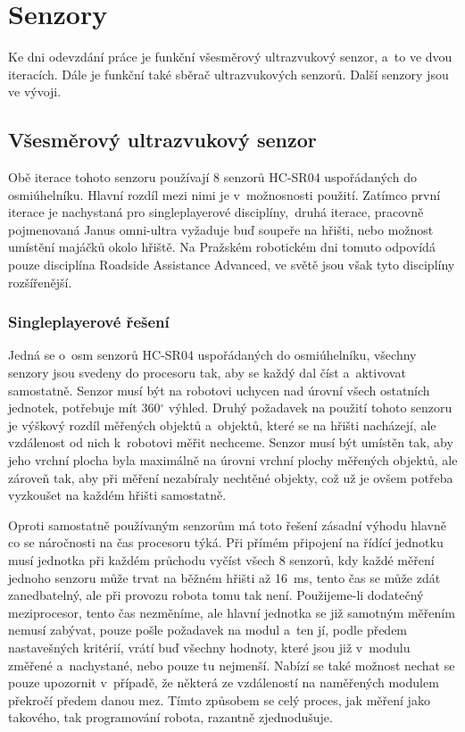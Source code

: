 \chapter{Senzory}
Ke dni odevzdání práce je funkční všesměrový ultrazvukový senzor, a~to ve dvou iteracích.
Dále je funkční také sběrač ultrazvukových senzorů.
Další senzory jsou ve vývoji.

\section{Všesměrový ultrazvukový senzor}
Obě iterace tohoto senzoru používají 8 senzorů HC-SR04 uspořádaných do osmiúhelníku.
Hlavní rozdíl mezi nimi je v~možnosnosti použití.
Zatímco první iterace je nachystaná pro singleplayerové disciplíny,~druhá iterace, pracovně pojmenovaná Janus omni-ultra vyžaduje buď soupeře na hřišti, nebo možnost umístění majáčků okolo hřiště. 
Na Pražském robotickém dni tomuto odpovídá pouze disciplína Roadside Assistance Advanced\cite{roadside}, ve světě jsou však tyto disciplíny rozšířenější.

\subsection{Singleplayerové řešení}
Jedná se o~osm senzorů HC-SR04 uspořádaných do osmiúhelníku, všechny senzory jsou svedeny do procesoru tak, aby se každý dal číst a~aktivovat samostatně.
Senzor musí být na robotovi uchycen nad úrovní všech ostatních jednotek, potřebuje mít 360$^{\circ}$ výhled.
Druhý požadavek na použití tohoto senzoru je výškový rozdíl měřených objektů a~objektů, které se na hřišti nacházejí, ale vzdálenost od nich k~robotovi měřit nechceme.
Senzor musí být umístěn tak, aby jeho vrchní plocha byla maximálně na úrovni vrchní plochy měřených objektů, ale zároveň tak, aby při měření nezabíraly nechtěné objekty, což už je ovšem potřeba vyzkoušet na každém hřišti samostatně.

Oproti samostatně používaným senzorům má toto řešení zásadní výhodu hlavně co se náročnosti na čas procesoru týká.
Při přímém připojení na řídící jednotku musí jednotka při každém průchodu vyčíst všech 8 senzorů, kdy každé měření jednoho senzoru může trvat na běžném hřišti až 16~ms, tento čas se může zdát zanedbatelný, ale při provozu robota tomu tak není.
Použijeme-li dodatečný meziprocesor, tento čas nezměníme, ale hlavní jednotka se již samotným měřením nemusí zabývat, pouze pošle požadavek na modul a~ten jí, podle předem nastavešných kritérií, vrátí buď všechny hodnoty, které jsou již v~modulu změřené a~nachystané, nebo pouze tu nejmenší.
Nabízí se také možnost nechat se pouze upozornit v~případě, že některá ze vzdáleností na naměřených modulem překročí předem danou mez.
Tímto způsobem se celý proces, jak měření jako takového, tak programování robota, razantně zjednodušuje.  

